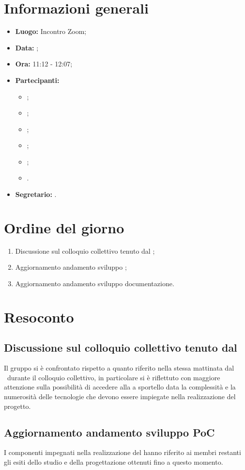 \section{Informazioni generali}
\begin{itemize}
	\item \textbf{Luogo:} Incontro Zoom;
	\item \textbf{Data:} \Data;
	\item \textbf{Ora:} 11:12 - 12:07;
	\item \textbf{Partecipanti:}
	\begin{itemize}
		\item \BL{}; 
		\item \FF{};
		\item \MM{}; 
		\item \PC{};
		\item \TG{};
		\item \TL{}.
	\end{itemize} 
	\item \textbf{Segretario:} \TG{}.
\end{itemize}

\section{Ordine del giorno}
\begin{enumerate}
	\item Discussione sul colloquio collettivo tenuto dal \VT;
	\item Aggiornamento andamento sviluppo ;
	\item Aggiornamento andamento sviluppo documentazione.
\end{enumerate}

\section{Resoconto}
\subsection{Discussione sul colloquio collettivo tenuto dal \VT}
Il gruppo si è confrontato rispetto a quanto riferito nella stessa mattinata dal \VT\ durante il colloquio collettivo, in particolare si è riflettuto con maggiore attenzione sulla possibilità di accedere alla  a sportello data la complessità e la numerosità delle tecnologie che devono essere impiegate nella realizzazione del progetto.
\subsection{Aggiornamento andamento sviluppo PoC}
I componenti impegnati nella realizzazione del  hanno riferito ai membri restanti gli esiti dello studio e della progettazione ottenuti fino a questo momento.
